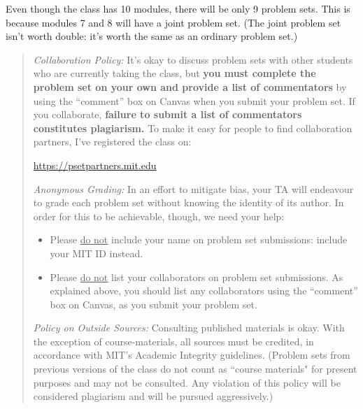 \documentclass[11pt, a4paper]{article}
\begin{document}
Even though the class has 10 modules, there will be only 9 problem sets. This is because modules 7 and 8 will have a joint problem set. (The joint problem set isn't worth double: it's worth the same as an ordinary problem set.)



\begin{quote}

    

\emph{Collaboration Policy:} It's okay to discuss problem sets with other students who are currently taking the class, but \textbf{you must complete the problem set on your own and provide a list of commentators} by using the ``comment'' box on Canvas when you submit your problem set. If you collaborate, \textbf{failure to submit a list of commentators constitutes plagiarism.}
To make it easy for people to find collaboration partners, I've registered the class on:
\begin{center}
\url{https://psetpartners.mit.edu}
\end{center}

\vspace{2mm}

\emph{Anonymous Grading:} In an effort to mitigate bias, your TA will endeavour to grade each problem set without knowing the identity of its author. In order for this to be achievable, though, we need your help:

\begin{itemize}
    \item Please \underline{do not} include your name on problem set submissions: {include your MIT ID instead}.
    
    \item Please \underline{do not} list your collaborators on  problem set submissions. As explained above, you should list any collaborators using the ``comment'' box on Canvas, as you submit your problem set.
\end{itemize}

\vspace{2mm}



\emph{Policy on Outside Sources:} Consulting published materials is okay. With the exception of course-materials, all sources must be credited, in accordance with MIT's Academic Integrity guidelines. (Problem sets from previous versions of the class do not count as ``course materials" for present purposes and may not be consulted. Any violation of this policy will be considered plagiarism and will be  pursued aggressively.)

\end{quote}
\end{document}
